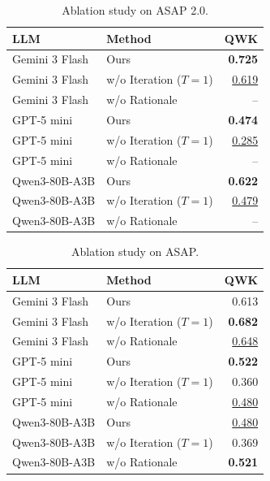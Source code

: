 \begin{table}[t]
\centering
\small
\caption{Ablation study on ASAP 2.0.}
\begin{tabular}{llr}
\toprule
LLM & Method & QWK \\
\midrule
Gemini 3 Flash & Ours & \textbf{0.725} \\
Gemini 3 Flash & w/o Iteration ($T=1$) & \underline{0.619} \\
Gemini 3 Flash & w/o Rationale & -- \\
\midrule
GPT-5 mini & Ours & \textbf{0.474} \\
GPT-5 mini & w/o Iteration ($T=1$) & \underline{0.285} \\
GPT-5 mini & w/o Rationale & -- \\
\midrule
Qwen3-80B-A3B & Ours & \textbf{0.622} \\
Qwen3-80B-A3B & w/o Iteration ($T=1$) & \underline{0.479} \\
Qwen3-80B-A3B & w/o Rationale & -- \\
\bottomrule
\end{tabular}
\end{table}

\begin{table}[t]
\centering
\small
\caption{Ablation study on ASAP.}
\begin{tabular}{llr}
\toprule
LLM & Method & QWK \\
\midrule
Gemini 3 Flash & Ours & 0.613 \\
Gemini 3 Flash & w/o Iteration ($T=1$) & \textbf{0.682} \\
Gemini 3 Flash & w/o Rationale & \underline{0.648} \\
\midrule
GPT-5 mini & Ours & \textbf{0.522} \\
GPT-5 mini & w/o Iteration ($T=1$) & 0.360 \\
GPT-5 mini & w/o Rationale & \underline{0.480} \\
\midrule
Qwen3-80B-A3B & Ours & \underline{0.480} \\
Qwen3-80B-A3B & w/o Iteration ($T=1$) & 0.369 \\
Qwen3-80B-A3B & w/o Rationale & \textbf{0.521} \\
\bottomrule
\end{tabular}
\end{table}

